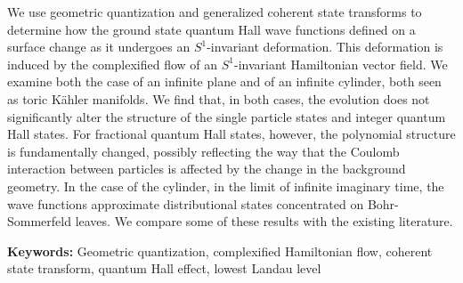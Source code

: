 \documentclass[notas.tex]{subfiles} 				%
\begin{document}
We use geometric quantization and generalized coherent state transforms to determine how the ground state quantum Hall wave functions defined on a surface change as it undergoes an $S^1$-invariant deformation. This deformation is induced by the complexified flow of an $S^1$-invariant Hamiltonian vector field. We examine both the case of an infinite plane and of an infinite cylinder, both seen as toric Kähler manifolds. We find that, in both cases, the evolution does not significantly alter the structure of the single particle states and integer quantum Hall states. For fractional quantum Hall states, however, the polynomial structure is fundamentally changed, possibly reflecting the way that the Coulomb interaction between particles is affected by the change in the background geometry. In the case of the cylinder, in the limit of infinite imaginary time, the wave functions approximate distributional states concentrated on Bohr-Sommerfeld leaves. We compare some of these results with the existing literature.

\bigskip
{\bfseries Keywords:} Geometric quantization, complexified Hamiltonian flow, coherent state transform, quantum Hall effect, lowest Landau level
\end{document}
